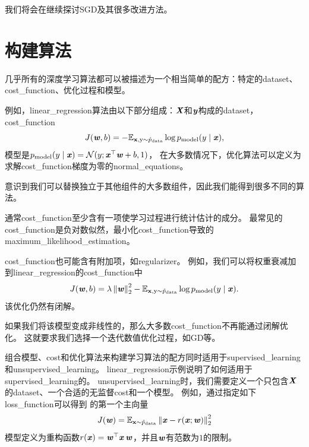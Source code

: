 我们将会在继续探讨\gls{SGD}及其很多改进方法。

\section{构建算法}
\label{sec:building_a_machine_learning_algorithm}
几乎所有的深度学习算法都可以被描述为一个相当简单的配方：特定的\gls{dataset}、\gls{cost_function}、优化过程和模型。

例如，\gls{linear_regression}算法由以下部分组成：$\boldsymbol{\mathit{X}}$和$\boldsymbol{\mathit{y}}$构成的\gls{dataset}，\gls{cost_function}
\begin{equation}
    J(\boldsymbol{\mathit{w}}, b) = -\mathbb{E}_{\mathbf{x},\mathrm{y}\sim\hat{p}_{\text{data}}}
    \log p_{\text{model}} (y \mid \boldsymbol{\mathit{x}}) ,
\end{equation}
模型是$p_{\text{model}} (y \mid \boldsymbol{\mathit{x}}) = \mathcal{N}(y; \boldsymbol{\mathit{x}}^\top \boldsymbol{\mathit{w}} + b, 1)$，
在大多数情况下，优化算法可以定义为求解\gls{cost_function}梯度为零的\gls{normal_equations}。

意识到我们可以替换独立于其他组件的大多数组件，因此我们能得到很多不同的算法。


通常\gls{cost_function}至少含有一项使学习过程进行统计估计的成分。
最常见的\gls{cost_function}是负对数似然，最小化\gls{cost_function}导致的\gls{maximum_likelihood_estimation}。

\gls{cost_function}也可能含有附加项，如\gls{regularizer}。
例如，我们可以将权重衰减加到\gls{linear_regression}的\gls{cost_function}中
\begin{equation}
    J(\boldsymbol{\mathit{w}}, b) = \lambda \left\lVert\boldsymbol{\mathit{w}}\right\rVert_2^2 - \mathbb{E}_{\mathbf{x},\mathrm{y}\sim \hat{p}_{\text{data}}}
    \log p_{\text{model}} (y \mid \boldsymbol{\mathit{x}}) .
\end{equation}
该优化仍然有闭解。

如果我们将该模型变成非线性的，那么大多数\gls{cost_function}不再能通过闭解优化。
这就要求我们选择一个迭代数值优化过程，如\gls{GD}等。

组合模型、\gls{cost}和优化算法来构建学习算法的配方同时适用于\gls{supervised_learning}和\gls{unsupervised_learning}。
\gls{linear_regression}示例说明了如何适用于\gls{supervised_learning}的。
\gls{unsupervised_learning}时，我们需要定义一个只包含$\boldsymbol{\mathit{X}}$的\gls{dataset}、一个合适的无监督\gls{cost}和一个模型。
例如，通过指定如下\gls{loss_function}可以得到\,\,的第一个主向量
\begin{equation}
    J(\boldsymbol{\mathit{w}}) = \mathbb{E}_{\mathbf{x} \sim \hat{p}_{\text{data}}} \left\lVert\boldsymbol{\mathit{x}} - r(\boldsymbol{\mathit{x}}; \boldsymbol{\mathit{w}})\right\rVert_2^2
\end{equation}
模型定义为重构函数$r(\boldsymbol{\mathit{x}}) = \boldsymbol{\mathit{w}}^\top\boldsymbol{\mathit{x}} \,\boldsymbol{\mathit{w}}$，并且$\boldsymbol{\mathit{w}}$有范数为$1$的限制。

